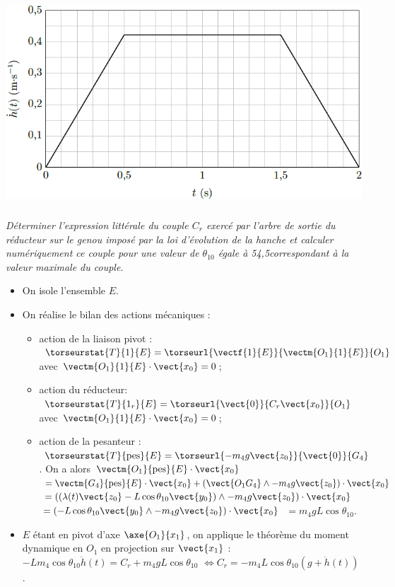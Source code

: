 \begin{multicols}{2}
\begin{center}
\includegraphics[width=.8\linewidth]{images/fig_11}
\end{center}
\fi

\subparagraph{} \textit{Déterminer l’expression littérale du couple $C_r$ exercé par l’arbre de sortie du réducteur sur le genou imposé par la loi d’évolution de la hanche et calculer numériquement ce couple pour une valeur de $\theta_{10}$ égale à
54,5\degres correspondant à la valeur maximale du couple.}

\ifprof
\begin{corrige}
\begin{itemize}
\item On isole l'ensemble $E$.
\item On réalise le bilan des actions mécaniques : 
\begin{itemize}
\item action de la liaison pivot : $\torseurstat{T}{1}{E}=\torseurl{\vectf{1}{E}}{\vectm{O_1}{1}{E}}{O_1}$ avec $\vectm{O_1}{1}{E}\cdot \vect{x_0}=0$;
\item action du réducteur: $\torseurstat{T}{1_r}{E}=\torseurl{\vect{0}}{C_r \vect{x_0}}{O_1}$ avec $\vectm{O_1}{1}{E}\cdot \vect{x_0}=0$;
\item action de la pesanteur : 
$\torseurstat{T}{\text{pes}}{E}=\torseurl{-m_4g\vect{z_0}}{\vect{0}}{G_4}$. On a alors 
$\vectm{O_1}{\text{pes}}{E}\cdot \vect{x_0}$ $=\vectm{G_4}{\text{pes}}{E}\cdot \vect{x_0}+\left(\vect{O_1G_4}\wedge -m_4g\vect{z_0} \right)\cdot \vect{x_0}$  
$=\left(\left(\lambda(t)\vect{z_0}-L\cos\theta_{10}\vect{y_0}\right)\wedge -m_4g\vect{z_0} \right)\cdot \vect{x_0}$ 
$=\left(-L\cos\theta_{10}\vect{y_0}\wedge -m_4g\vect{z_0}\right)\cdot \vect{x_0}$ $= m_4gL\cos\theta_{10}$.
\end{itemize}
\item $E$ étant en pivot d'axe $\axe{O_1}{{x_1}}$, on applique le théorème du moment dynamique en $O_1$ en projection sur $\vect{x_1}$ :
$-Lm_4\cos\theta_{10}\ddot{h}(t) =C_r +m_4gL\cos\theta_{10}$
$ \Leftrightarrow C_r=-m_4 L \cos\theta_{10} \left(g+\ddot{h}(t)\right) $. 
\end{itemize}


\end{corrige}
\end{multicols}
